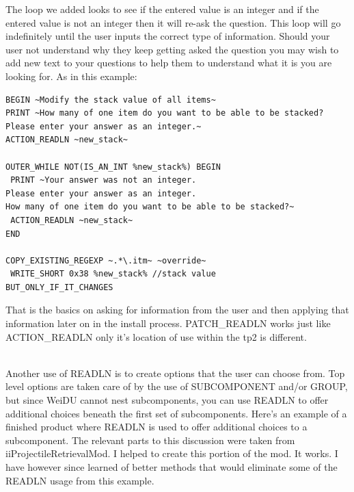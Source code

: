 \documentclass{article}
\begin{document}
The loop we added looks to see if the entered value is an integer and if the
entered value is not an integer then it will re-ask the question.  This loop
will go indefinitely until the user inputs the correct type of information.
Should your user not understand why they keep getting asked the question you may
wish to add new text to your questions to help them to understand what it is
you are looking for.  As in this example:

\begin{verbatim}
BEGIN ~Modify the stack value of all items~
PRINT ~How many of one item do you want to be able to be stacked?
Please enter your answer as an integer.~
ACTION_READLN ~new_stack~

OUTER_WHILE NOT(IS_AN_INT %new_stack%) BEGIN
 PRINT ~Your answer was not an integer.
Please enter your answer as an integer.
How many of one item do you want to be able to be stacked?~
 ACTION_READLN ~new_stack~
END

COPY_EXISTING_REGEXP ~.*\.itm~ ~override~
 WRITE_SHORT 0x38 %new_stack% //stack value
BUT_ONLY_IF_IT_CHANGES
\end{verbatim}

That is the basics on asking for information from the user and then applying that
information later on in the install process.  PATCH_READLN works just like
ACTION_READLN only it's location of use within the tp2 is different.

\\

Another use of READLN is to create options that the user can choose from.
Top level options are taken care of by the use of SUBCOMPONENT and/or GROUP, but since
WeiDU cannot nest subcomponents, you can use READLN to offer additional choices beneath
the first set of subcomponents.  Here's an example of a finished product where READLN is
used to offer additional choices to a subcomponent.  The relevant parts to this discussion
were taken from iiProjectileRetrievalMod.  I helped to create this portion of the mod.
It works.  I have however since learned of better methods that would eliminate some of the
READLN usage from this example.
\end{document}
